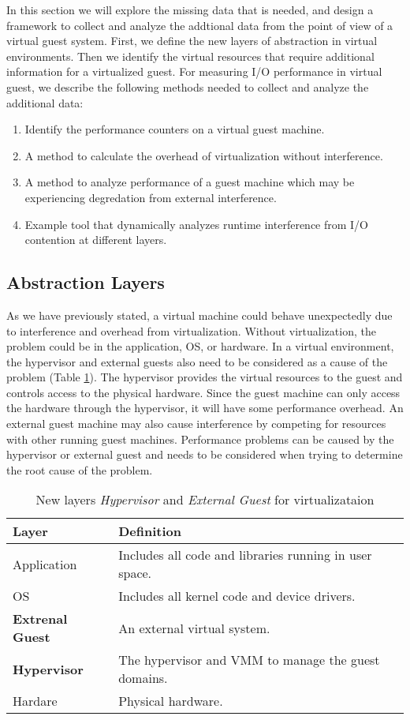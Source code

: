 In this section we will explore the missing data that is needed, and design a framework to collect and analyze the addtional data from the point of view of a virtual guest system. 
First, we define the new layers of abstraction in virtual environments.  
Then we identify the virtual resources that require additional information for a virtualized guest.
For measuring I/O performance in virtual guest, we describe the following methods needed to collect and analyze the additional data:
\begin {enumerate}
  \item Identify the performance counters on a virtual guest machine.
  \item A method to calculate the overhead of virtualization without interference.
  \item A method to analyze performance of a guest machine which may be experiencing degredation from external interference.
  \item Example tool that dynamically analyzes runtime interference from I/O contention at different layers.
\end{enumerate}

\subsection{Abstraction Layers}
As we have previously stated, a virtual machine could behave unexpectedly due to interference and overhead from virtualization.
Without virtualization, the problem could be in the application, OS, or hardware.  
In a virtual environment, the hypervisor and external guests also need to be considered as a cause of the problem (Table \ref{tab:layers}).  
The hypervisor provides the virtual resources to the guest and controls access to the physical hardware.  
Since the guest machine can only access the hardware through the hypervisor, it will have some performance overhead. 
An external guest machine may also cause interference by competing for resources with other running guest machines.  
Performance problems can be caused by the hypervisor or external guest and needs to be considered when trying to determine the root cause of the problem.

\begin{table}[h]
\begin{tabular}{ l p{10cm} }
  Layer & Definition \\
  \hline
  Application & Includes all code and libraries running in user space. \\
  OS & Includes all kernel code and device drivers. \\
  \textbf{Extrenal Guest} & An external virtual system. \\
  \textbf{Hypervisor} & The hypervisor and VMM to manage the guest domains. \\
  Hardare & Physical hardware. \\
  \hline
\end{tabular}
\caption{New layers \emph{Hypervisor} and \emph{External Guest} for virtualizataion}
\label{tab:layers}
\end{table}

